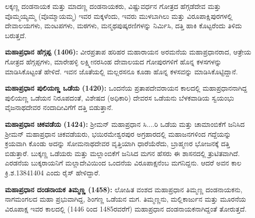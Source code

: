 ಲಕ್ಕಣ್ಣ ದಂಡನಾಯಕ ಮತ್ತು ಮಾದಣ್ಣ ದಂಡನಾಯಕರು, ವಿಷ್ಣುವರ್ಧನ ಗೋತ್ರದ ಹೆಗ್ಗಡೆದೇವ ಮತ್ತು ವೊಮ್ಮಯ್ಯಮ್ಮ (ವೊಮ್ಮಾಯಮ್ಮ) ಇವರ ಮಕ್ಕಳೆಂದು, ಇವರು ಮುಳಬಾಗಿಲು ಮತ್ತು ವಿರೂಪಾಕ್ಷಿಪುರಗಳಲ್ಲಿ ದೇವಾಲಯಗಳು, ಮಂಟಪಗಳು, ಮಠಗಳು, ಮನ್ಮಥಪುಷ್ಕರಣಿಗಳನ್ನು ನಿರ್ಮಿಸಿ, ದತ್ತಿ ಹಾಕಿ ಕೊಟ್ಟರೆಂದು ತಿಳಿದು ಬರುತ್ತದೆ.

\textbf{ಮಹಾಪ್ರಧಾನ ಹೆಗ್ಗಪ್ಪ (1406):} ವೀರಪ್ರತಾಪ ಹರಿಹರ ಮಹಾರಾಯನ ಅರಮನೆಯ ಮಹಾಪ್ರಧಾನರಾದ, ಆತ್ರೇಯ ಗೋತ್ರದ ಹೆಗ್ಗಪ್ಪಗಳು, ಮಾರೇಹಳ್ಳಿ ಲಕ್ಷ್ಮೀನರಸಿಂಹ ದೇವಾಲಯದ ಗೋಪುರಗಳಿಗೆ ಹೊನ್ನ ಕಳಸಗಳನ್ನು ಮಾಡಿಸಿಕೊಟ್ಟಂತೆ ಹೇಳಿದೆ. ಇವನ ಜೊತೆಯಲ್ಲಿ ಮಲ್ಲರಸನೂ ಕೂಡಾ ಹೊನ್ನ ಕಳಸವನ್ನು ಮಾಡಿಸಿಕೊಟ್ಟಿದ್ದಾನೆ.

\textbf{ಮಹಾಪ್ರಧಾನ ಪುಲಿಯಣ್ಣ ಒಡೆಯ (1420):} ಒಂದನೆಯ ಪ್ರತಾಪದೇವರಾಯನ ಕಾಲದಲ್ಲಿ ಮಹಾಪ್ರಧಾನ\-ನಾಗಿದ್ದ ಪುಲಿಯಣ್ಣ ಒಡೆಯನ ನಿರೂಪದಂತೆ, ವಿಶೇಷದ (ಅಧಿಕಾರಿ) ದೇವರಸ ಒಡೆಯನು ಬೆಳಕವಾಡಿಯ ಸ್ವಯಂಭು ವೈಜನಾಥದೇವರ ನಂದಾದೀವಿಗೆಗೆ ದತ್ತಿ ಬಿಡುತ್ತಾನೆ.

\textbf{ಮಹಾಪ್ರಧಾನ ಚಿಕವಡೆಯ (1424):} ಶ‍್ರೀಮನ್​ ಮಹಾಪ್ರಧಾನ ಸಿ....ರಿ ಒಡೆಯ ಮತ್ತು ಚಾಮಾಂಬಿಕೆಗೆ ಜನಿಸಿದ ಶ‍್ರೀಮನ್​ ಮಹಾಪ್ರಧಾನ ಚಿಕವಡೆಯರು, ಭಯಿರಮೇಶ್ವರಪುರ ಅಗ್ರಹಾರದಲ್ಲಿ ಮಹಾಜನಗಳಿಂದ ಗದ್ದೆಯನ್ನು ಕ್ರಯವಾಗಿ ಕೊಂಡು ಅದನ್ನು ಸೋಮನಾಥದೇವರ ವೃತ್ತಿಯಾಗಿ ಧಾರೆಯೆರೆದು, ಬ್ರಾಹ್ಮಣರ ಭೋಜನಕ್ಕೆ ದತ್ತಿ ಬಿಡುತ್ತಾರೆ. ಬುಕ್ಕಣ್ಣ ಒಡೆಯರು ಮತ್ತು ಮಲ್ಲಾಂಬಿಕೆಗೆ ಜನಿಸಿದ ಮಗನ ಹೆಸರು ಈ ಶಾಸನದಲ್ಲಿ ತ್ರುಟಿತವಾಗಿದೆ. ಎರಡನೆಯ ಬುಕ್ಕರಾಯನಿಗೆ ಮಲ್ಲಾದೇವಿಯಿಂದ ಒಂದನೆಯ ವಿರೂಪಾಕ್ಷನೆಂಬ ಮಗನಿದ್ದನು. ಆದರೆ ಅವನ ಕಾಲ ಕ್ರಿ.ಶ.1384\enginline{-}1404 ಎಂದು ರೈಸ್​ ಹೇಳಿದ್ದಾರೆ.

\textbf{ಮಹಾಪ್ರಧಾನ ದಂಡನಾಯಕ ತಿಮ್ಮಣ್ಣ (1458):} ಲೋಹಿತ ವಂಶದ ಮಹಾಪ್ರಧಾನ ತಿಮ್ಮಣ್ಣ ದಂಡನಾಯಕನು, ನಾಗಮಂಗಲದ ಮಹಾ ಪ್ರಭುವಾಗಿದ್ದ, ಶಿಂಗಣ್ಣ ಒಡೆಯನ ಮಗ. ತಿಮ್ಮಣ್ಣನು, ಮಲ್ಲಿಕಾರ್ಜುನ ಮತ್ತು ಮೂರನೆಯ ವಿರೂಪಾಕ್ಷ ಇವರ ಕಾಲದಲ್ಲಿ (1446 ರಿಂದ 1485ರವರೆಗೆ) ಮಹಾಪ್ರಧಾನ ದಂಡನಾಯಕನಾಗಿದ್ದಂತೆ ತೋರುತ್ತದೆ.

